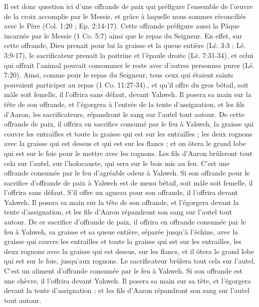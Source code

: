 \begin{multicols}{2}
{Il est donc question ici d’une offrande de paix qui préfigure  l’ensemble de l’œuvre de la croix accomplie par le Messie, et grâce à laquelle nous sommes réconciliés avec le Père (Col. 1:20 ; Ep. 2:14-17). Cette offrande préfigure aussi la Pâque incarnée par le Messie (1 Co. 5:7) ainsi que le repas du Seigneur. En effet, sur cette offrande, Dieu prenait pour lui la graisse et la queue entière (Lé. 3:3 ; Lé. 3:9-17), le sacrificateur prenait la poitrine et l’épaule droite (Lé. 7:31-34), et celui qui offrait l’animal pouvait consommer le reste avec d’autres personnes pures (Lé. 7:20). Ainsi, comme pour le repas du Seigneur, tous ceux qui étaient saints pouvaient participer au repas (1 Co. 11:27-34).}, et qu'il offre du gros bétail, soit mâle soit femelle, il l'offrira sans défaut, devant Yahweh.
Il posera sa main sur la tête de son offrande, et l'égorgera à l'entrée de la tente d'assignation, et les fils d'Aaron, les sacrificateurs, répandront le sang sur l'autel tout autour.
De cette offrande de paix, il offrira en sacrifice consumé par le feu à Yahweh, la graisse qui couvre les entrailles et toute la graisse qui est sur les entrailles ;
les deux rognons avec la graisse qui est dessus et qui est sur les flancs ; et on ôtera le grand lobe qui est sur le foie pour le mettre avec les rognons.
Les fils d'Aaron brûleront tout cela sur l'autel, sur l'holocauste, qui sera sur le bois mis au feu. C'est une offrande consumée par le feu d’agréable odeur à Yahweh.
Si son offrande pour le sacrifice d’offrande de paix à Yahweh est de menu bétail, soit mâle soit femelle, il l'offrira sans défaut.
S'il offre un agneau pour son offrande, il l'offrira devant Yahweh.
Il posera sa main sur la tête de son offrande, et l'égorgera devant la tente d'assignation, et les fils d'Aaron répandront son sang sur l'autel tout autour.
De ce sacrifice d’offrande de paix, il offrira en offrande consumée par le feu à Yahweh, sa graisse et sa queue entière, séparée jusqu’à l'échine, avec la graisse qui couvre les entrailles et toute la graisse qui est sur les entrailles,
les deux rognons avec la graisse qui est dessus, sur les flancs, et il ôtera le grand lobe qui est sur le foie, jusqu’aux rognons.
Le sacrificateur brûlera tout cela sur l'autel. C'est un aliment d'offrande consumée par le feu à Yahweh.
Si son offrande est une chèvre, il l'offrira devant Yahweh.
Il posera sa main sur sa tête, et l'égorgera devant la tente d'assignation ; et les fils d'Aaron répandront son sang sur l'autel tout autour.

\end{multicols}

